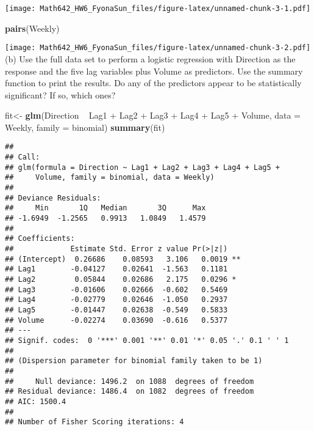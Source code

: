 \documentclass[]{article}
\newenvironment{Shaded}{\begin{snugshade}}{\end{snugshade}}
\newcommand{\KeywordTok}[1]{\textcolor[rgb]{0.13,0.29,0.53}{\textbf{{#1}}}}
\newcommand{\DataTypeTok}[1]{\textcolor[rgb]{0.13,0.29,0.53}{{#1}}}
\newcommand{\StringTok}[1]{\textcolor[rgb]{0.31,0.60,0.02}{{#1}}}
\newcommand{\NormalTok}[1]{{#1}}
\begin{document}
\texttt{[image: Math642\_HW6\_FyonaSun\_files/figure-latex/unnamed-chunk-3-1.pdf]}

\begin{Shaded}
\begin{Highlighting}[]
\KeywordTok{pairs}\NormalTok{(Weekly)}
\end{Highlighting}
\end{Shaded}

\texttt{[image: Math642\_HW6\_FyonaSun\_files/figure-latex/unnamed-chunk-3-2.pdf]}
(b) Use the full data set to perform a logistic regression with
Direction as the response and the five lag variables plus Volume as
predictors. Use the summary function to print the results. Do any of the
predictors appear to be statistically significant? If so, which ones?

\begin{Shaded}
\begin{Highlighting}[]
\NormalTok{fit<-}\StringTok{ }\KeywordTok{glm}\NormalTok{(Direction ~}\StringTok{ }\NormalTok{Lag1 +}\StringTok{ }\NormalTok{Lag2 +}\StringTok{ }\NormalTok{Lag3 +}\StringTok{ }\NormalTok{Lag4 +}\StringTok{ }\NormalTok{Lag5 +}\StringTok{ }\NormalTok{Volume, }\DataTypeTok{data =} \NormalTok{Weekly, }\DataTypeTok{family =} \NormalTok{binomial)}
\KeywordTok{summary}\NormalTok{(fit)}
\end{Highlighting}
\end{Shaded}

\begin{verbatim}
## 
## Call:
## glm(formula = Direction ~ Lag1 + Lag2 + Lag3 + Lag4 + Lag5 + 
##     Volume, family = binomial, data = Weekly)
## 
## Deviance Residuals: 
##     Min       1Q   Median       3Q      Max  
## -1.6949  -1.2565   0.9913   1.0849   1.4579  
## 
## Coefficients:
##             Estimate Std. Error z value Pr(>|z|)   
## (Intercept)  0.26686    0.08593   3.106   0.0019 **
## Lag1        -0.04127    0.02641  -1.563   0.1181   
## Lag2         0.05844    0.02686   2.175   0.0296 * 
## Lag3        -0.01606    0.02666  -0.602   0.5469   
## Lag4        -0.02779    0.02646  -1.050   0.2937   
## Lag5        -0.01447    0.02638  -0.549   0.5833   
## Volume      -0.02274    0.03690  -0.616   0.5377   
## ---
## Signif. codes:  0 '***' 0.001 '**' 0.01 '*' 0.05 '.' 0.1 ' ' 1
## 
## (Dispersion parameter for binomial family taken to be 1)
## 
##     Null deviance: 1496.2  on 1088  degrees of freedom
## Residual deviance: 1486.4  on 1082  degrees of freedom
## AIC: 1500.4
## 
## Number of Fisher Scoring iterations: 4
\end{verbatim}
\end{document}
